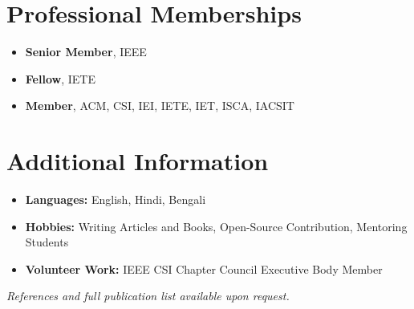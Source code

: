 \documentclass[10pt,a4paper]{article}
\begin{document}
	\section*{Professional Memberships}
	
	\begin{itemize}[leftmargin=0.15in]
		\item \textbf{Senior Member}, IEEE
		\item \textbf{Fellow}, IETE
		\item \textbf{Member}, ACM, CSI, IEI, IETE, IET, ISCA, IACSIT
	\end{itemize}
	
	\section*{Additional Information}
	
	\begin{itemize}[leftmargin=0.15in]
		\item \textbf{Languages:} English, Hindi, Bengali
		\item \textbf{Hobbies:} Writing Articles and Books, Open-Source Contribution, Mentoring Students
		\item \textbf{Volunteer Work:} IEEE CSI Chapter Council Executive Body Member
	\end{itemize}
	
	\vfill
	
	\begin{center}
		\textit{References and full publication list available upon request.}
	\end{center}
	
\end{document}
